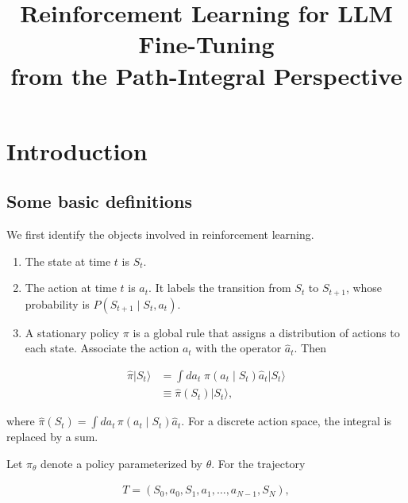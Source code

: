 \documentclass[11pt]{article}
\title{Reinforcement Learning for LLM Fine-Tuning\\
from the Path-Integral Perspective}
\author{}
\date{}
\begin{document}
\maketitle
\tableofcontents

\newpage
\section{Introduction}

\subsection{Some basic definitions}

We first identify the objects involved in reinforcement learning.

\begin{enumerate}
    \item The state at time \(t\) is \(S_t\).

    \item The action at time \(t\) is \(a_t\).  It labels the transition
    from \(S_t\) to \(S_{t+1}\), whose probability is
    \(P(S_{t+1}\mid S_t,a_t)\).

    \item A stationary policy \(\pi\) is a global rule that assigns a
    distribution of actions to each state.  Associate the action \(a_t\)
    with the operator \(\widehat{a}_t\).  Then
\end{enumerate}

\begin{equation}
    \begin{split}
    \widehat{\pi}|S_t\rangle
    &=\int da_t\;\pi(a_t\mid S_t)\widehat{a}_t|S_t\rangle\\
    &\equiv\widehat{\pi}(S_t)|S_t\rangle,
    \end{split}
    \label{eq:policy-operator}
\end{equation}

where
\(\widehat{\pi}(S_t)=\int da_t\,\pi(a_t\mid S_t)\widehat{a}_t\).
For a discrete action space, the integral is replaced by a sum.

Let \(\pi_\theta\) denote a policy parameterized by \(\theta\).  For the
trajectory

\begin{equation}
    \begin{split}
        T=(S_0,a_0,S_1,a_1,\ldots,a_{N-1},S_N),
    \end{split}
    \label{eq:trajectory}
\end{equation}
\end{document}
